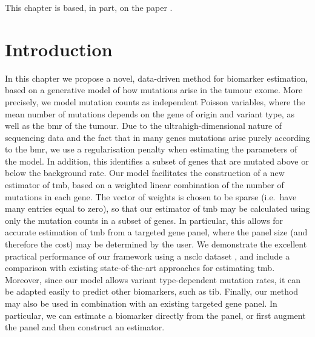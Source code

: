 \documentclass[../thesis.tex]{subfiles}
\begin{document}
This chapter is based, in part, on the paper \citep{}.
\section{Introduction}





In this chapter we propose a novel, data-driven method for biomarker estimation, based on a generative model of how mutations arise in the tumour exome.  More precisely, we model mutation counts as independent Poisson variables, where the mean number of mutations depends on the gene of origin and variant type, as well as the \gls{bmr} of the tumour. Due to the ultrahigh-dimensional nature of sequencing data and the fact that in many genes mutations arise purely according to the \gls{bmr}, we use a regularisation penalty when estimating the parameters of the model. In addition, this identifies a subset of genes that are mutated above or below the background rate. Our model facilitates the construction of a new estimator of \gls{tmb}, based on a weighted linear combination of the number of mutations in each gene. The vector of weights is chosen to be sparse (i.e.~have many entries equal to zero), so that our estimator of \gls{tmb} may be calculated using only the mutation counts in a subset of genes. In particular, this allows for accurate estimation of \gls{tmb} from a targeted gene panel, where the panel size (and therefore the cost) may be determined by the user.  We demonstrate the excellent practical performance of our framework using a \gls{nsclc} dataset \citep{chalmers_analysis_2017}, and include a comparison with existing state-of-the-art approaches for estimating \gls{tmb}.  Moreover, since our model allows variant type-dependent mutation rates, it can be adapted easily to predict other biomarkers, such as \gls{tib}. Finally, our method may also be used in combination with an existing targeted gene panel. In particular, we can estimate a biomarker directly from the panel, or first augment the panel and then construct an estimator.  
\end{document}
